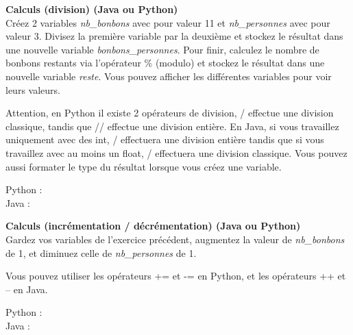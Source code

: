 \begin{Exercice}[20 minutes] \textbf{Calculs (division) (Java ou Python)}\\
   Créez 2 variables \textit{nb\_bonbons} avec pour valeur 11 et \textit{nb\_personnes} avec pour valeur 3. Divisez la première variable par la deuxième et stockez le résultat dans une nouvelle variable \textit{bonbons\_personnes}. Pour finir, calculez le nombre de bonbons restants via l'opérateur \% (modulo) et stockez le résultat dans une nouvelle variable \textit{reste}. Vous pouvez afficher les différentes variables pour voir leurs valeurs. \\
   
    \begin{conseil}
      	Attention, en Python il existe 2 opérateurs de division, / effectue une division classique, tandis que // effectue une division entière. En Java, si vous travaillez uniquement avec des int, / effectuera une division entière tandis que si vous travaillez avec au moins un float, / effectuera une division classique. Vous pouvez aussi formater le type du résultat lorsque vous créez une variable.
        
    \end{conseil}
    \begin{solution}
    
    Python : \\
    
    
    
    Java : \\
    
    
           
    \end{solution}   
\end{Exercice}

\begin{Exercice}[20 minutes] \textbf{Calculs (incrémentation / décrémentation) (Java ou Python)}\\
   Gardez vos variables de l'exercice précédent, augmentez la valeur de \textit{nb\_bonbons} de 1, et diminuez celle de \textit{nb\_personnes} de 1.  \\
   
    \begin{conseil}
      	Vous pouvez utiliser les opérateurs += et -= en Python, et les opérateurs ++ et -- en Java.
        
    \end{conseil}
    \begin{solution}
    
    Python : \\
    
    
    
    Java : \\
    
    
           
    \end{solution}   
\end{Exercice}

